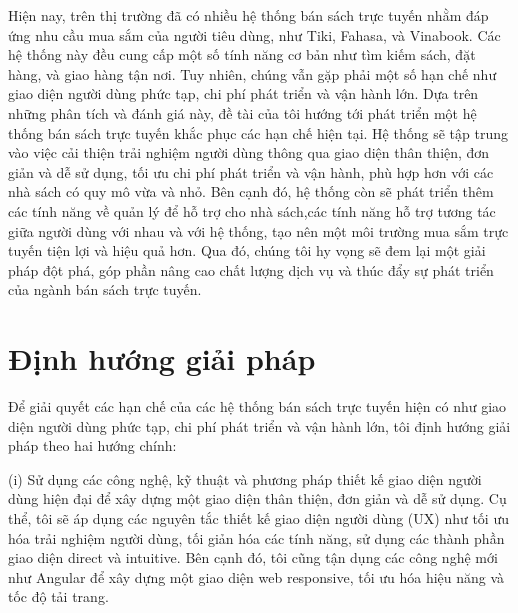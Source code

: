 \documentclass[../DoAn.tex]{subfiles}
\begin{document}
Hiện nay, trên thị trường đã có nhiều hệ thống bán sách trực tuyến nhằm đáp ứng nhu cầu mua sắm của người tiêu dùng, như Tiki, Fahasa, và Vinabook. Các hệ thống này đều cung cấp một số tính năng cơ bản như tìm kiếm sách, đặt hàng, và giao hàng tận nơi. Tuy nhiên, chúng vẫn gặp phải một số hạn chế như giao diện người dùng phức tạp, chi phí phát triển và vận hành lớn. Dựa trên những phân tích và đánh giá này, đề tài của tôi hướng tới phát triển một hệ thống bán sách trực tuyến khắc phục các hạn chế hiện tại. Hệ thống sẽ tập trung vào việc cải thiện trải nghiệm người dùng thông qua giao diện thân thiện, đơn giản và dễ sử dụng, tối ưu chi phí phát triển và vận hành, phù hợp hơn với các nhà sách có quy mô vừa và nhỏ. Bên cạnh đó, hệ thống còn sẽ phát triển thêm các tính năng về quản lý để hỗ trợ cho nhà sách,các tính năng hỗ trợ tương tác giữa người dùng với nhau và với hệ thống, tạo nên một môi trường mua sắm trực tuyến tiện lợi và hiệu quả hơn. Qua đó, chúng tôi hy vọng sẽ đem lại một giải pháp đột phá, góp phần nâng cao chất lượng dịch vụ và thúc đẩy sự phát triển của ngành bán sách trực tuyến.

\section{Định hướng giải pháp}
\label{section:1.3}


Để giải quyết các hạn chế của các hệ thống bán sách trực tuyến hiện có như giao diện người dùng phức tạp, chi phí phát triển và vận hành lớn, tôi định hướng giải pháp theo hai hướng chính:

(i) Sử dụng các công nghệ, kỹ thuật và phương pháp thiết kế giao diện người dùng hiện đại để xây dựng một giao diện thân thiện, đơn giản và dễ sử dụng. Cụ thể, tôi sẽ áp dụng các nguyên tắc thiết kế giao diện người dùng (UX) như tối ưu hóa trải nghiệm người dùng, tối giản hóa các tính năng, sử dụng các thành phần giao diện direct và intuitive. Bên cạnh đó, tôi cũng tận dụng các công nghệ mới như Angular để xây dựng một giao diện web responsive, tối ưu hóa hiệu năng và tốc độ tải trang.
\end{document}
